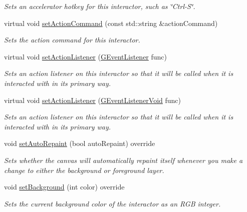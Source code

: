 \begin{DoxyCompactItemize}
\begin{DoxyCompactList}\small\item\em Sets an accelerator hotkey for this interactor, such as \char`\"{}\+Ctrl-\/\+S\char`\"{}. \end{DoxyCompactList}\item 
virtual void \mbox{\hyperlink{classsgl_1_1GInteractor_a4b5843fe3030e038a1ba54cc03389bcf}{set\+Action\+Command}} (const std\+::string \&action\+Command)
\begin{DoxyCompactList}\small\item\em Sets the action command for this interactor. \end{DoxyCompactList}\item 
virtual void \mbox{\hyperlink{classsgl_1_1GInteractor_adcfb4742430c88714fcf57e57ab8ea9c}{set\+Action\+Listener}} (\mbox{\hyperlink{namespacesgl_ae9f3e9eab70035da1a2b114e21357b25}{G\+Event\+Listener}} func)
\begin{DoxyCompactList}\small\item\em Sets an action listener on this interactor so that it will be called when it is interacted with in its primary way. \end{DoxyCompactList}\item 
virtual void \mbox{\hyperlink{classsgl_1_1GInteractor_aebd20a89c7a8a43a6fce999cf4f9fcf2}{set\+Action\+Listener}} (\mbox{\hyperlink{namespacesgl_a54427ce97bb1c2804e4fe2b0a62e8b17}{G\+Event\+Listener\+Void}} func)
\begin{DoxyCompactList}\small\item\em Sets an action listener on this interactor so that it will be called when it is interacted with in its primary way. \end{DoxyCompactList}\item 
void \mbox{\hyperlink{classsgl_1_1GCanvas_acb65220cc16d17df02a0c08d35b60988}{set\+Auto\+Repaint}} (bool auto\+Repaint) override
\begin{DoxyCompactList}\small\item\em Sets whether the canvas will automatically repaint itself whenever you make a change to either the background or foreground layer. \end{DoxyCompactList}\item 
void \mbox{\hyperlink{classsgl_1_1GCanvas_a10d305826534b55561ea88730fc9f6cd}{set\+Background}} (int color) override
\begin{DoxyCompactList}\small\item\em Sets the current background color of the interactor as an R\+GB integer. \end{DoxyCompactList}\item 

\end{DoxyCompactItemize}

